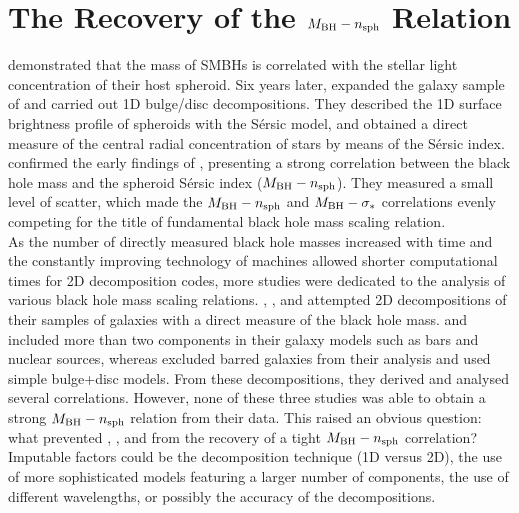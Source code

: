 \chapter{The Recovery of the $M_{\rm BH} - n_{\rm sph}$ Relation}
\label{ch:recov-mn}

\cite{graham2001} demonstrated that the mass of SMBHs is correlated 
with the stellar light concentration of their host spheroid. 
Six years later, \cite{grahamdriver2007} expanded the galaxy sample of \cite{graham2001} 
and carried out 1D bulge/disc decompositions. 
They described the 1D surface brightness profile of spheroids with the S\'ersic model, 
and obtained a direct measure of the central radial concentration of stars 
by means of the S\'ersic index. 
\cite{grahamdriver2007} confirmed the early findings of \cite{graham2001}, 
presenting a strong correlation between the black hole mass and the spheroid S\'ersic index ($M_{\rm BH} - n_{\rm sph}$). 
They measured a small level of scatter, 
which made the $M_{\rm BH} - n_{\rm sph}$ and $M_{\rm BH} - \sigma_*$ correlations 
evenly competing for the title of fundamental black hole mass scaling relation. \\

As the number of directly measured black hole masses increased with time and
the constantly improving technology of machines allowed shorter computational times for 2D decomposition codes, 
more studies were dedicated to the analysis of various black hole mass scaling relations. 
\cite{sani2011}, \cite{vika2012}, and \cite{beifiori2012} attempted 2D decompositions 
of their samples of galaxies with a direct measure of the black hole mass. 
\citeauthor{sani2011} and \citeauthor{vika2012} included more than two components in their galaxy models 
such as bars and nuclear sources, 
whereas \citeauthor{beifiori2012} excluded barred galaxies from their analysis 
and used simple bulge+disc models. 
From these decompositions, they derived and analysed several correlations. 
However, none of these three studies was able to obtain a strong $M_{\rm BH} - n_{\rm sph}$ relation from their data. 
This raised an obvious question: 
what prevented \citeauthor{sani2011}, \citeauthor{vika2012}, and \citeauthor{beifiori2012} 
from the recovery of a tight $M_{\rm BH} - n_{\rm sph}$ correlation? 
Imputable factors could be the decomposition technique (1D versus 2D), 
the use of more sophisticated models featuring a larger number of components, 
the use of different wavelengths, 
or possibly the accuracy of the decompositions. \\

